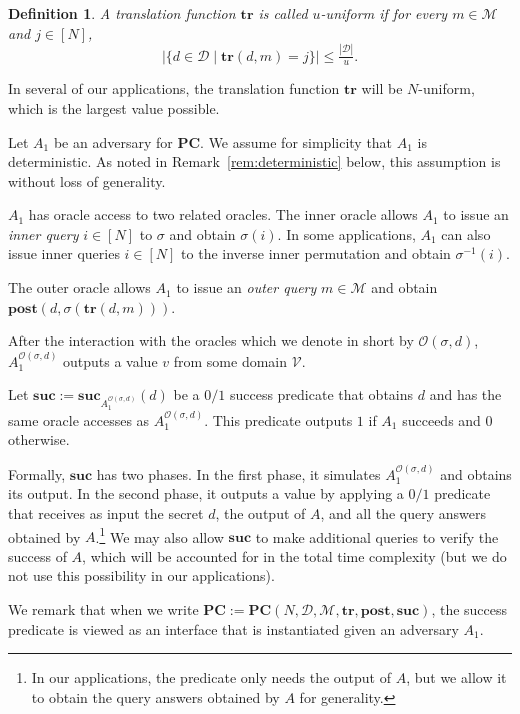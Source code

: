 \documentclass[11pt]{article}
\newtheorem{definition}[theorem]{Definition}
\newcommand{\SECS}{{\mathcal{D}}}
\newcommand{\secv}{{d}}
\newcommand{\SUC}{\boldsymbol{suc}}
\newcommand{\TR}{\boldsymbol{tr}}
\newcommand{\POST}{\boldsymbol{post}}
\newcommand{\PC}{\boldsymbol{PC}}
\begin{document}
\begin{definition}
A translation function $\TR$ is called $u$-uniform if for every $m \in \mathcal{M}$ and $j \in [N]$, 
$$ |\{\secv \in \SECS \mid \TR(\secv,m) = j\}| \leq \tfrac{|\SECS|}{u}.$$
\end{definition}
\noindent In several of our applications, the translation function $\TR$ will be $N$-uniform, which is the largest value possible.


Let $A_1$ be an adversary for $\PC$. We assume for simplicity that $A_1$ is deterministic. As noted in Remark~\ref{rem:deterministic} below, this assumption is without loss of generality. 


$A_1$ has oracle access to two related oracles. The inner oracle allows $A_1$ to issue an \emph{inner query} $i \in [N]$ to $\sigma$ and obtain $\sigma(i)$.
In some applications, $A_1$ can also issue inner queries $i \in [N]$ to the inverse inner permutation and obtain $\sigma^{-1}(i)$.

The outer oracle allows $A_1$ to issue an \emph{outer query} $m \in \mathcal{M}$ and obtain 
$\POST(\secv,\sigma(\TR(\secv,m)))$.

After the interaction with the oracles 
which we denote in short by $\mathcal{O}(\sigma,\secv)$, $A_1^{\mathcal{O}(\sigma,\secv)}$ outputs a value $v$ 
from some domain $\mathcal{V}$.

Let $\SUC := \SUC_{A_1^{\mathcal{O}(\sigma,\secv)}}(\secv)$ be a $0/1$ success predicate that obtains $\secv$ and has the same oracle accesses as $A_1^{\mathcal{O}(\sigma,\secv)}$. This predicate outputs $1$ if $A_1$ succeeds and $0$ otherwise.

Formally, $\SUC$ has two phases. In the first phase, it simulates $A_1^{\mathcal{O}(\sigma,\secv)}$ and obtains its output. In the second phase, it outputs a value by applying a $0/1$ predicate that receives as input the secret $\secv$, the output of $A$, and all the query answers obtained by $A$.\footnote{In our applications, the predicate only needs the output of $A$, but we allow it to obtain the query answers obtained by $A$ for generality.}
We may also allow $\SUC$ to make additional queries to verify the success of $A$, which will be accounted for in the total time complexity (but we do not use this possibility in our applications).

We remark that when we write
$\PC := \PC(N,\SECS,\mathcal{M},\TR,\POST,\SUC)$,
the success predicate is viewed as an interface that is instantiated given an adversary $A_1$.
\end{document}
